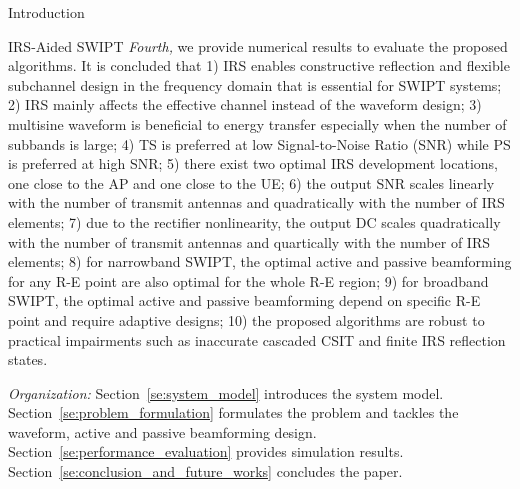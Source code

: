 \documentclass[journal]{IEEEtran}
\begin{document}
\begin{section}{Introduction}
\begin{subsection}{IRS-Aided SWIPT}
			\emph{Fourth,} we provide numerical results to evaluate the proposed algorithms. It is concluded that 1) IRS enables constructive reflection and flexible subchannel design in the frequency domain that is essential for SWIPT systems; 2) IRS mainly affects the effective channel instead of the waveform design; 3) multisine waveform is beneficial to energy transfer especially when the number of subbands is large; 4) TS is preferred at low Signal-to-Noise Ratio (SNR) while PS is preferred at high SNR; 5) there exist two optimal IRS development locations, one close to the AP and one close to the UE; 6) the output SNR scales linearly with the number of transmit antennas and quadratically with the number of IRS elements; 7) due to the rectifier nonlinearity, the output DC scales quadratically with the number of transmit antennas and quartically with the number of IRS elements; 8) for narrowband SWIPT, the optimal active and passive beamforming for any R-E point are also optimal for the whole R-E region; 9) for broadband SWIPT, the optimal active and passive beamforming depend on specific R-E point and require adaptive designs; 10) the proposed algorithms are robust to practical impairments such as inaccurate cascaded CSIT and finite IRS reflection states.

			\emph{Organization:} Section~\ref{se:system_model} introduces the system model. Section~\ref{se:problem_formulation} formulates the problem and tackles the waveform, active and passive beamforming design. Section~\ref{se:performance_evaluation} provides simulation results. Section~\ref{se:conclusion_and_future_works} concludes the paper.


\end{subsection}
\end{section}
\end{document}
